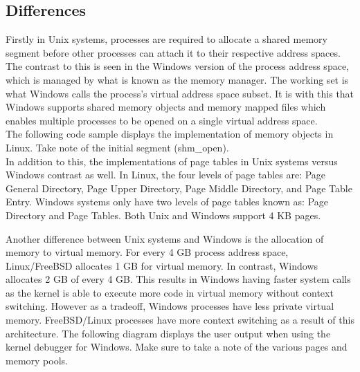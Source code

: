 \documentclass[letterpaper,10pt,titlepage]{article}
\begin{document}
\subsection{Differences}

Firstly in Unix systems, processes are required to allocate a shared memory segment before other processes can attach it to their respective address spaces.  The contrast to this is seen in the Windows version of the process address space, which is managed by what is known as the memory manager.\cite{mwi10}  The working set is what Windows calls the process's virtual address space subset.  It is with this that Windows supports shared memory objects and memory mapped files which enables multiple processes to be opened on a single virtual address space.\\

The following code sample displays the implementation of memory objects in Linux.  Take note of the initial segment (shm\_open).\cite{lkd12}\\



In addition to this, the implementations of page tables in Unix systems versus Windows contrast as well.  In Linux, the four levels of page tables are: Page General Directory, Page Upper Directory, Page Middle Directory, and Page Table Entry.\cite{lkd12}  Windows systems only have two levels of page tables known as: Page Directory and Page Tables.  Both Unix and Windows support 4 KB pages.

Another difference between Unix systems and Windows is the allocation of memory to virtual memory.  For every 4 GB process address space, Linux/FreeBSD allocates 1 GB for virtual memory.  In contrast, Windows allocates 2 GB of every 4 GB.\cite{mwi10}  This results in Windows having faster system calls as the kernel is able to execute more code in virtual memory without context switching.  However as a tradeoff, Windows processes have less private virtual memory.  FreeBSD/Linux processes have more context switching as a result of this architecture.  The following diagram displays the user output when using the kernel debugger for Windows.\cite{mwi10}  Make sure to take a note of the various pages and memory pools.\\


\end{document}
